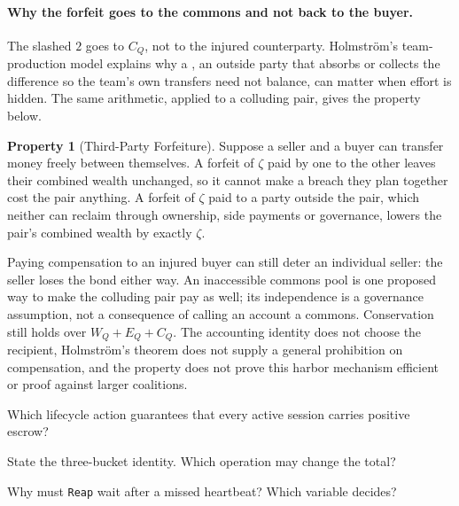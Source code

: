 \documentclass[11pt,a4paper]{article}
\theoremstyle{definition}
\newtheorem{property}{Property}[section]
\theoremstyle{remark}
\begin{document}
\paragraph{Why the forfeit goes to the commons and not back to the buyer.}
The slashed $2$ goes to $C_Q$, not to the injured counterparty.
Holmström's team-production model  explains why a
, an outside party that absorbs or collects the
difference so the team's own transfers need not balance, can matter when
effort is hidden. The same arithmetic, applied to a colluding pair, gives the
property below.

\begin{property}[Third-Party Forfeiture]\label{prop:third-party-forfeiture}
\setlength{\parskip}{4pt plus 1pt}
Suppose a seller and a buyer can transfer money freely between themselves. A
forfeit of $\zeta$ paid by one to the other leaves their combined wealth
unchanged, so it cannot make a breach they plan together cost the pair
anything. A forfeit of $\zeta$ paid to a party outside the pair, which neither
can reclaim through ownership, side payments or governance, lowers the pair's
combined wealth by exactly $\zeta$.
\end{property}

Paying compensation to an injured buyer can still deter an individual seller:
the seller loses the bond either way. An inaccessible commons pool is one
proposed way to make the colluding pair pay as well; its independence is a
governance assumption, not a consequence of calling an account a commons.
Conservation still holds over $W_Q+E_Q+C_Q$. The accounting identity does not
choose the recipient, Holmström's theorem does not supply a general
prohibition on compensation, and the property does not prove this harbor
mechanism efficient or proof against larger coalitions.





\pdexercisepointer*{\ref{ex:bonded-conservation-states}}{\ref{ex:bonded-stake-judge}}{\pageref{ex:bonded-conservation-states}}

\begin{pdrecitation}
\item Which lifecycle action guarantees that every active session carries positive escrow?
\item State the three-bucket identity. Which operation may change the total?
\item Why must \texttt{Reap} wait after a missed heartbeat? Which variable decides?
\end{pdrecitation}
\end{document}
